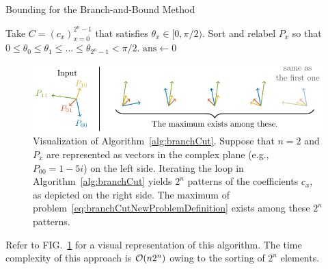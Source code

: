 \documentclass[aps,prx,onecolumn,superscriptaddress,nobibnotes,nofootinbib]{revtex4-2}
\begin{document}
\begin{algorithm}[ht]
  \caption{Bounding for the Branch-and-Bound Method}
  \label{alg:branchCut}
  Take $C=(c_x)_{x=0}^{2^n-1}$ that satisfies $\theta_x
    \in [0, \pi / 2)$.\;
  Sort and relabel $P_x$ so that $0 \leq \theta_0 \leq \theta_1 \leq \dots \leq \theta_{2^n-1} < \pi/2$.\;
  $\mathrm{ans} \leftarrow 0$\;
\end{algorithm}

\begin{figure}[t]
  \centering
  \includegraphics[width=\columnwidth]{imgs/argsort.pdf}
  \caption{
    Visualization of Algorithm~\ref{alg:branchCut}.
    Suppose that $n=2$ and $P_x$ are represented as vectors in the complex plane
    (e.g., $P_{00} = 1-5i$) on the left side.
    Iterating the loop in Algorithm~\ref{alg:branchCut}
    yields $2^n$ patterns of the coefficients $c_x$,
    as depicted on the right side.
    The maximum of problem~\eqref{eq:branchCutNewProblemDefinition}
    exists among these $2^n$ patterns.
  }
  \label{fig:argsort}
\end{figure}

Refer to FIG.~\ref{fig:argsort} for a visual representation of this algorithm.
The time complexity of this approach is $\order{n2^n}$ owing to the sorting of $2^n$ elements.
\end{document}
